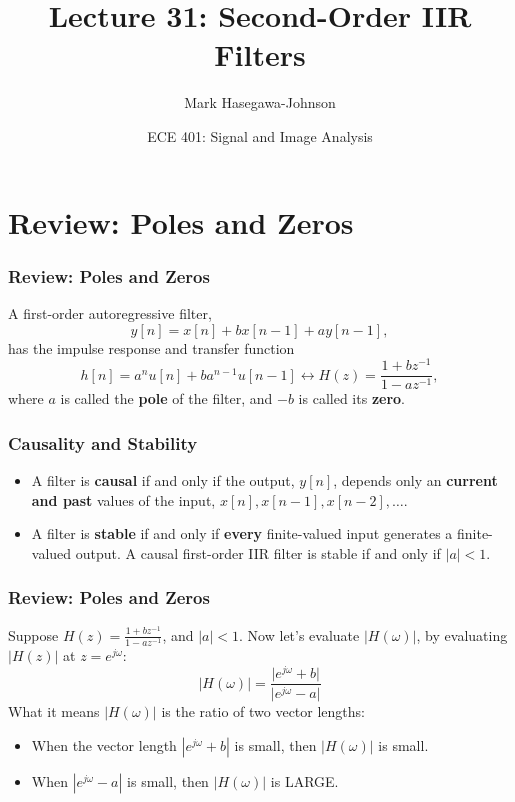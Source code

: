 \documentclass{beamer}
\title{Lecture 31: Second-Order IIR Filters}
\author{Mark Hasegawa-Johnson}
\date{ECE 401: Signal and Image Analysis}
\begin{document}
\begin{frame}
  \maketitle
\end{frame}

\begin{frame}
  \tableofcontents
\end{frame}

\section[Review]{Review: Poles and Zeros}
\setcounter{subsection}{1}

\begin{frame}
  \frametitle{Review: Poles and Zeros}
  A first-order autoregressive filter,
  \[
  y[n] = x[n]+bx[n-1]+ay[n-1],
  \]
  has the impulse response and transfer function
  \[
  h[n]=a^n u[n]+ba^{n-1}u[n-1] \leftrightarrow H(z)  = \frac{1+bz^{-1}}{1-az^{-1}},
  \]
  where $a$ is called the {\bf pole} of the filter, and $-b$ is called
  its {\bf zero}.
\end{frame}

\begin{frame}
  \frametitle{Causality and Stability}
  \begin{itemize}
  \item A filter is {\bf causal} if and only if the output, $y[n]$,
    depends only an {\bf current and past} values of the input, $x[n],
    x[n-1],x[n-2],\ldots$.
  \item A filter is {\bf stable} if and only if {\bf every}
    finite-valued input generates a finite-valued output.  A causal
    first-order IIR filter is stable if and only if $|a|<1$.
  \end{itemize}
\end{frame}

\begin{frame}
  \frametitle{Review: Poles and Zeros}

  Suppose $H(z)=\frac{1+bz^{-1}}{1-az^{-1}}$, and $|a|<1$.  Now let's
  evaluate $|H(\omega)|$, by evaluating $|H(z)|$ at $z=e^{j\omega}$:
  \[
  \vert H(\omega)\vert = 
  \frac{\vert e^{j\omega}+b\vert}{\vert e^{j\omega}-a\vert}
  \]
  What it means $|H(\omega)|$ is the ratio of two vector lengths:
  \begin{itemize}
  \item When the vector length $|e^{j\omega}+b|$ is small, then
    $|H(\omega)|$ is small.
  \item When $|e^{j\omega}-a|$ is small, then $|H(\omega)|$ is LARGE.
  \end{itemize}
\end{frame}
\end{document}
